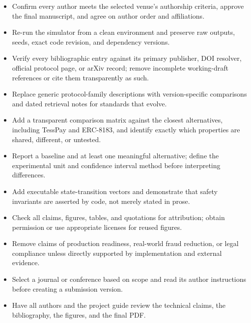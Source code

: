 \documentclass[12pt,a4paper,oneside]{report}
\begin{document}
\begin{itemize}[leftmargin=*,itemsep=0pt,topsep=1pt,parsep=0pt]
\footnotesize
\item Confirm every author meets the selected venue's authorship criteria, approve the final manuscript, and agree on author order and affiliations.
\item Re-run the simulator from a clean environment and preserve raw outputs, seeds, exact code revision, and dependency versions.
\item Verify every bibliographic entry against its primary publisher, DOI resolver, official protocol page, or arXiv record; remove incomplete working-draft references or cite them transparently as such.
\item Replace generic protocol-family descriptions with version-specific comparisons and dated retrieval notes for standards that evolve.
\item Add a transparent comparison matrix against the closest alternatives, including TessPay and ERC-8183, and identify exactly which properties are shared, different, or untested.
\item Report a baseline and at least one meaningful alternative; define the experimental unit and confidence interval method before interpreting differences.
\item Add executable state-transition vectors and demonstrate that safety invariants are asserted by code, not merely stated in prose.
\item Check all claims, figures, tables, and quotations for attribution; obtain permission or use appropriate licenses for reused figures.
\item Remove claims of production readiness, real-world fraud reduction, or legal compliance unless directly supported by implementation and external evidence.
\item Select a journal or conference based on scope and read its author instructions before creating a submission version.
\item Have all authors and the project guide review the technical claims, the bibliography, the figures, and the final PDF.
\end{itemize}
\normalsize
\end{document}
